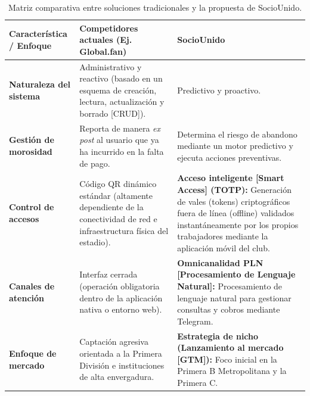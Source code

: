 \begin{table}[h!]
\centering
\renewcommand{\arraystretch}{1.5}
\begin{tabularx}{\textwidth}{|l|X|X|}
\hline
\rowcolor{gray!20} \textbf{Característica / Enfoque} & \textbf{Competidores actuales (Ej. Global.fan)} & \textbf{SocioUnido} \\ \hline
\textbf{Naturaleza del sistema} & Administrativo y reactivo (basado en un esquema de creación, lectura, actualización y borrado [CRUD]). & Predictivo y proactivo. \\ \hline
\textbf{Gestión de morosidad} & Reporta de manera \textit{ex post} al usuario que ya ha incurrido en la falta de pago. & Determina el riesgo de abandono mediante un motor predictivo y ejecuta acciones preventivas. \\ \hline
\textbf{Control de accesos} & Código QR dinámico estándar (altamente dependiente de la conectividad de red e infraestructura física del estadio). & \textbf{Acceso inteligente [Smart Access] (TOTP):} Generación de vales (tokens) criptográficos fuera de línea (offline) validados instantáneamente por los propios trabajadores mediante la aplicación móvil del club. \\ \hline
\textbf{Canales de atención} & Interfaz cerrada (operación obligatoria dentro de la aplicación nativa o entorno web). & \textbf{Omnicanalidad PLN [Procesamiento de Lenguaje Natural]:} Procesamiento de lenguaje natural para gestionar consultas y cobros mediante Telegram. \\ \hline
\textbf{Enfoque de mercado} & Captación agresiva orientada a la Primera División e instituciones de alta envergadura. & \textbf{Estrategia de nicho (Lanzamiento al mercado [GTM]):} Foco inicial en la Primera B Metropolitana y la Primera C. \\ \hline
\end{tabularx}
\caption{Matriz comparativa entre soluciones tradicionales y la propuesta de SocioUnido.}
\label{tab:cuadro_comparativo}
\end{table}
